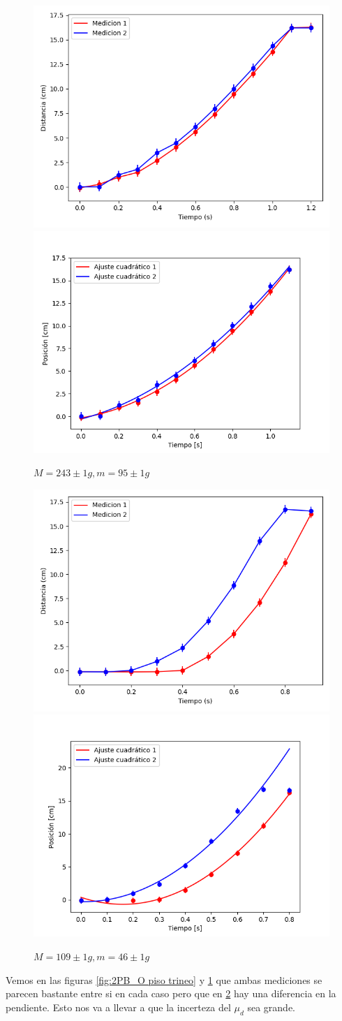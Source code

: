 \documentclass[12pt,a4]{article}
\begin{document}
\begin{figure}[H]
    \centering
    \includegraphics[width=0.4\linewidth]{TiempoVsDistanciaPisoMaderaMPB_O.png}
    \includegraphics[width=0.44\linewidth]{ajuste2_PisoMaderaMPB_O.png}
    \caption{$M = 243 \pm 1 g, m = 95 \pm 1 g$}
    \label{fig:M_OP piso trineo}
\end{figure}

\begin{figure}[H]
    \centering
    \includegraphics[width=0.4\linewidth]{TiempoVsDistanciaPisoMaderaV_2P.png}
    \includegraphics[width=0.44\linewidth]{ajuste2_PisoMaderaV_2P.png}
    \caption{$M = 109 \pm 1 g, m = 46 \pm 1 g$}
    \label{fig:V_2P piso trineo}
\end{figure}


Vemos en las figuras \ref{fig:2PB_O piso trineo} y \ref{fig:M_OP piso trineo} que ambas mediciones se parecen bastante entre si en cada caso pero que en \ref{fig:V_2P piso trineo} hay una diferencia en la pendiente. Esto nos va a llevar a que la incerteza del $\mu_d$ sea grande.
\end{document}
